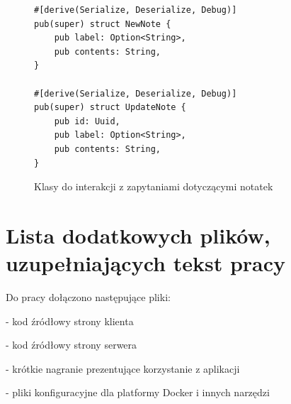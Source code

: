 \documentclass[a4paper,twoside,12pt]{book}
\begin{document}
\begin{appendices}
\begin{figure}[H]
\centering
\begin{lstlisting}
#[derive(Serialize, Deserialize, Debug)]
pub(super) struct NewNote {
    pub label: Option<String>,
    pub contents: String,
}

#[derive(Serialize, Deserialize, Debug)]
pub(super) struct UpdateNote {
    pub id: Uuid,
    pub label: Option<String>,
    pub contents: String,
}
\end{lstlisting}
\caption{Klasy do interakcji z zapytaniami dotyczącymi notatek}
\label{fig:pseudokod:klasa-interact-note}
\end{figure}




\chapter{Lista dodatkowych plików, uzupełniających tekst pracy} 

Do pracy dołączono następujące pliki:

- kod źródłowy strony klienta

- kod źródłowy strony serwera

- krótkie nagranie prezentujące korzystanie z aplikacji

- pliki konfiguracyjne dla platformy Docker i innych narzędzi

\listoffigures
{}
\listoftables
{}

\end{appendices}
\end{document}
